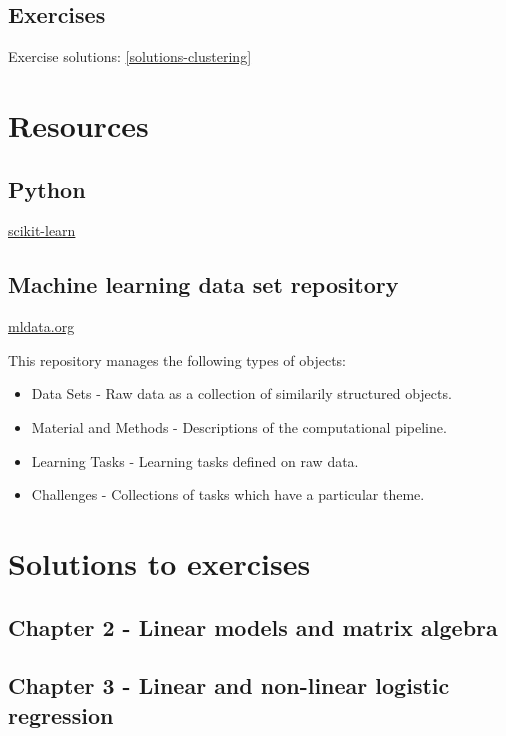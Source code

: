 \documentclass[]{book}
\providecommand{\tightlist}{%
  \setlength{\itemsep}{0pt}\setlength{\parskip}{0pt}}
\theoremstyle{definition}
\theoremstyle{definition}
\theoremstyle{definition}
\theoremstyle{remark}
\begin{document}
\section{Exercises}\label{exercises}

Exercise solutions: \ref{solutions-clustering}

\appendix


\chapter{Resources}\label{resources}

\section{Python}\label{python}

\href{http://scikit-learn.org}{scikit-learn}

\section{Machine learning data set
repository}\label{machine-learning-data-set-repository}

\href{http://mldata.org/}{mldata.org}

This repository manages the following types of objects:

\begin{itemize}
\tightlist
\item
  Data Sets - Raw data as a collection of similarily structured objects.
\item
  Material and Methods - Descriptions of the computational pipeline.
\item
  Learning Tasks - Learning tasks defined on raw data.
\item
  Challenges - Collections of tasks which have a particular theme.
\end{itemize}

\chapter{Solutions to exercises}\label{solutions-to-exercises}

\section{Chapter 2 - Linear models and matrix
algebra}\label{solutions-linear-models}

\section{Chapter 3 - Linear and non-linear logistic
regression}\label{solutions-logistic-regression}
\end{document}
